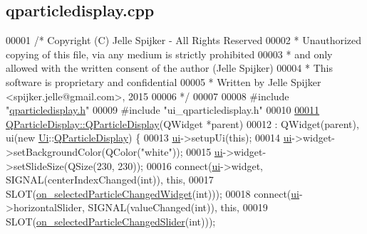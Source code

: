 \hypertarget{qparticledisplay_8cpp_source}{}\subsection{qparticledisplay.\+cpp}
\label{qparticledisplay_8cpp_source}

\begin{DoxyCode}
00001 \textcolor{comment}{/* Copyright (C) Jelle Spijker - All Rights Reserved}
00002 \textcolor{comment}{ * Unauthorized copying of this file, via any medium is strictly prohibited}
00003 \textcolor{comment}{ * and only allowed with the written consent of the author (Jelle Spijker)}
00004 \textcolor{comment}{ * This software is proprietary and confidential}
00005 \textcolor{comment}{ * Written by Jelle Spijker <spijker.jelle@gmail.com>, 2015}
00006 \textcolor{comment}{ */}
00007 
00008 \textcolor{preprocessor}{#include "\hyperlink{qparticledisplay_8h}{qparticledisplay.h}"}
00009 \textcolor{preprocessor}{#include "ui\_qparticledisplay.h"}
00010 
\hypertarget{qparticledisplay_8cpp_source_l00011}{}\hyperlink{class_q_particle_display_a552bc093c084d6212b6b4ace6f14c3d1}{00011} \hyperlink{class_q_particle_display_a552bc093c084d6212b6b4ace6f14c3d1}{QParticleDisplay::QParticleDisplay}(QWidget *parent)
00012     : QWidget(parent), ui(new \hyperlink{namespace_ui}{Ui}::\hyperlink{class_q_particle_display}{QParticleDisplay}) \{
00013   \hyperlink{class_q_particle_display_ae4e6c27c6c2059b4e08358938044a18c}{ui}->setupUi(\textcolor{keyword}{this});
00014   \hyperlink{class_q_particle_display_ae4e6c27c6c2059b4e08358938044a18c}{ui}->widget->setBackgroundColor(QColor(\textcolor{stringliteral}{"white"}));
00015   \hyperlink{class_q_particle_display_ae4e6c27c6c2059b4e08358938044a18c}{ui}->widget->setSlideSize(QSize(230, 230));
00016   connect(\hyperlink{class_q_particle_display_ae4e6c27c6c2059b4e08358938044a18c}{ui}->widget, SIGNAL(centerIndexChanged(\textcolor{keywordtype}{int})), \textcolor{keyword}{this},
00017           SLOT(\hyperlink{class_q_particle_display_aa19e1abd163291e87e8b4f2547e90155}{on\_selectedParticleChangedWidget}(\textcolor{keywordtype}{int})));
00018   connect(\hyperlink{class_q_particle_display_ae4e6c27c6c2059b4e08358938044a18c}{ui}->horizontalSlider, SIGNAL(valueChanged(\textcolor{keywordtype}{int})), \textcolor{keyword}{this},
00019           SLOT(\hyperlink{class_q_particle_display_ae532d16adee8293f3ee5fb984b614bdf}{on\_selectedParticleChangedSlider}(\textcolor{keywordtype}{int})));

\end{DoxyCode}
